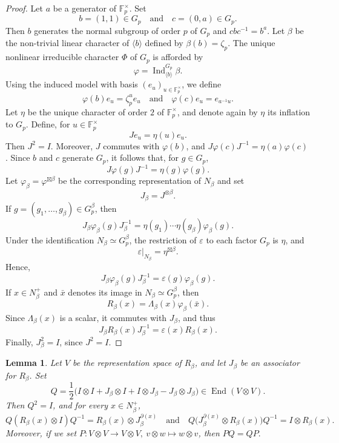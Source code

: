 \documentclass[reqno]{amsart}
\DeclareMathOperator{\End}{End}
\DeclareMathOperator{\Ind}{Ind}
\newtheorem{lemma}[theorem]{Lemma}     %
\theoremstyle{definition}
\begin{document}
\begin{proof}
Let $a$ be a generator of $\mathbb F_p^\times$. Set
\[
b=(1,1)\in G_p
\quad\text{and}\quad
c=(0,a)\in G_p.
\]
Then $b$ generates the normal subgroup of order $p$ of $G_p$ and
$cbc^{-1}=b^a$. 
Let $\beta$ be the non-trivial linear character of $\langle b\rangle$
defined by
$\beta(b)=\zeta_p$.
The unique nonlinear irreducible character $\Phi$ of $G_p$ is afforded
by
\[
\varphi=\Ind_{\langle b\rangle}^{G_p}\beta.
\]
Using the induced model with basis
$(e_u)_{u\in\mathbb F_p^\times}$, we define
\[
\varphi(b)e_u=\zeta_p^u e_u
\quad\text{and}\quad
\varphi(c)e_u=e_{a^{-1}u}.
\]
Let $\eta$ be the unique character of order $2$ of
$\mathbb F_p^\times$, and denote again by $\eta$ its inflation to
$G_p$. Define, for $u\in\mathbb F_p^{\times}$
\begin{equation}
\label{eq:defassbase}
Je_u=\eta(u)e_u.
\end{equation}
Then $J^2=I$. Moreover, $J$ commutes with $\varphi(b)$, and
$J\varphi(c)J^{-1} = \eta(a)\varphi(c)$.
Since $b$ and $c$ generate $G_p$, it follows that, for $g\in G_p$,
\[
J\varphi(g)J^{-1}
=
\eta(g)\varphi(g).
\]
Let $ \varphi_\beta=\varphi^{\boxtimes \beta} $ be the corresponding
representation of $ N_\beta $ and set
\[
J_\beta=J^{\otimes \beta}.
\]
If $g=(g_1,\ldots,g_\beta)\in G_p^\beta$, then
\[
J_\beta\varphi_\beta(g)J_\beta^{-1}
=
\eta(g_1)\cdots\eta(g_\beta)\varphi_\beta(g).
\]
Under the identification $N_\beta\simeq G_p^\beta$, the restriction of
$\varepsilon$ to each factor $G_p$ is $\eta$, and 
\[
\varepsilon|_{N_\beta}=\eta^{\boxtimes \beta}.
\]
Hence,
\[
J_\beta\varphi_\beta(g)J_\beta^{-1}
=
\varepsilon(g)\varphi_\beta(g).
\]
If $x\in N_\beta^+$ and $\bar x$ denotes its image in
$N_\beta\simeq G_p^\beta$, then
\[
R_\beta(x)=\Lambda_\beta(x)\varphi_\beta(\bar x).
\]
Since $\Lambda_\beta(x)$ is a scalar, it commutes with $J_\beta$, and thus
\[
J_\beta R_\beta(x)J_\beta^{-1}
=
\varepsilon(x)R_\beta(x).
\]
Finally, $J_\beta^2=I$, since $J^2=I$.
\end{proof}

\begin{lemma}
\label{lem:TD}
Let $V$ be the representation space of $R_\beta$, and let
$J_\beta$ be an associator for $R_\beta$.
Set
\begin{equation}
\label{eq:defQ}
Q
=
\frac12\bigl(
I\otimes I
+J_\beta\otimes I
+I\otimes J_\beta
-J_\beta\otimes J_\beta
\bigr)
\in\End(V\otimes V).
\end{equation}
Then $Q^2=I$, and for every $x\in N_\beta^+$,
\[
Q(R_\beta(x)\otimes I)Q^{-1}
=
R_\beta(x)\otimes J_\beta^{\partial(x)}
\quad \text{and}\quad
Q\bigr(J_\beta^{\partial(x)}\otimes R_\beta(x)\bigr)Q^{-1}
=
I\otimes R_\beta(x).
\]
Moreover, if we set $P: V\otimes V\longrightarrow V\otimes V,\ v\otimes
w\longmapsto w\otimes v$, then
$
PQ=QP.
$
\end{lemma}
\end{document}
